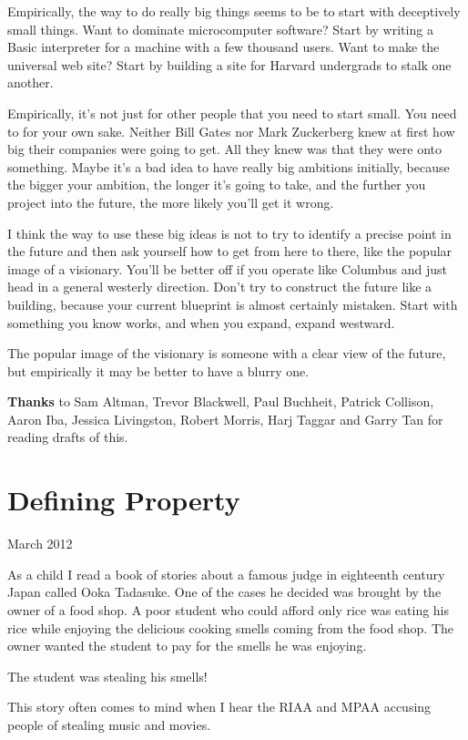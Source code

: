 \documentclass[12pt]{book}
\begin{document}
Empirically, the way to do really big things seems to be to start with
deceptively small things. Want to dominate microcomputer software? Start
by writing a Basic interpreter for a machine with a few thousand users.
Want to make the universal web site? Start by building a site for
Harvard undergrads to stalk one another.

Empirically, it's not just for other people that you need to start
small. You need to for your own sake. Neither Bill Gates nor Mark
Zuckerberg knew at first how big their companies were going to get. All
they knew was that they were onto something. Maybe it's a bad idea to
have really big ambitions initially, because the bigger your ambition,
the longer it's going to take, and the further you project into the
future, the more likely you'll get it wrong.

I think the way to use these big ideas is not to try to identify a
precise point in the future and then ask yourself how to get from here
to there, like the popular image of a visionary. You'll be better off if
you operate like Columbus and just head in a general westerly direction.
Don't try to construct the future like a building, because your current
blueprint is almost certainly mistaken. Start with something you know
works, and when you expand, expand westward.

The popular image of the visionary is someone with a clear view of the
future, but empirically it may be better to have a blurry one.


\textbf{Thanks} to Sam Altman, Trevor Blackwell, Paul Buchheit, Patrick
Collison, Aaron Iba, Jessica Livingston, Robert Morris, Harj Taggar and
Garry Tan for reading drafts of this.
\chapter{Defining Property}

March 2012

As a child I read a book of stories about a famous judge in eighteenth
century Japan called Ooka Tadasuke. One of the cases he decided was
brought by the owner of a food shop. A poor student who could afford
only rice was eating his rice while enjoying the delicious cooking
smells coming from the food shop. The owner wanted the student to pay
for the smells he was enjoying.

The student was stealing his smells!

This story often comes to mind when I hear the RIAA and MPAA accusing
people of stealing music and movies.
\end{document}

